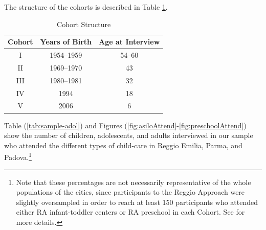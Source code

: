 \documentclass[12pt]{article}
\begin{document}
The structure of the cohorts is described in Table \ref{tab:cohorts}.

\begin{table}[ht]
\caption{Cohort Structure}
\label{tab:cohorts}
\begin{center}
\begin{tabular}{ccc}
\hline\hline
Cohort & Years of Birth & Age at Interview \\ \hline
I & 1954--1959 & 54--60 \\ 
II & 1969--1970 & 43 \\ 
III & 1980--1981 & 32 \\ 
IV & 1994 & 18 \\ 
V & 2006 & 6 \\ \hline
\end{tabular}
\end{center}
\end{table}


Table (\ref{tab:sample-adol}) and Figures (\ref{fig:asiloAttend}-\ref{fig:preschoolAttend}) show the number of children, adolescents, and adults interviewed in our sample who attended the different types of child-care in Reggio Emilia, Parma, and Padova.\footnote{Note that these percentages are not necessarily representative of the whole populations of the cities, since participants to the Reggio Approach were slightly oversampled in order to reach at least 150 participants who attended either RA infant-toddler centers or RA preschool in each Cohort. See \citep{Biroli2015} for more details.}
\end{document}
